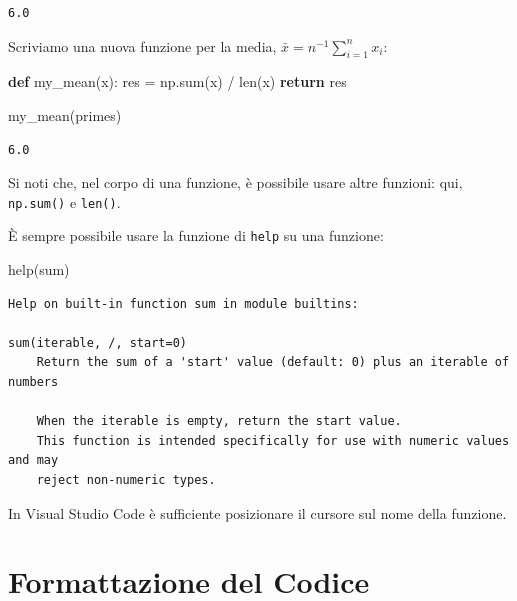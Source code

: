 \documentclass[
  letterpaper,
  krantz2]{{[}./krantz{]}}
\newenvironment{Shaded}{\begin{snugshade}}{\end{snugshade}}
\newcommand{\BuiltInTok}[1]{\textcolor[rgb]{0.00,0.23,0.31}{#1}}
\newcommand{\ControlFlowTok}[1]{\textcolor[rgb]{0.00,0.23,0.31}{\textbf{#1}}}
\newcommand{\KeywordTok}[1]{\textcolor[rgb]{0.00,0.23,0.31}{\textbf{#1}}}
\newcommand{\NormalTok}[1]{\textcolor[rgb]{0.00,0.23,0.31}{#1}}
\newcommand{\OperatorTok}[1]{\textcolor[rgb]{0.37,0.37,0.37}{#1}}
\begin{document}
\begin{verbatim}
6.0
\end{verbatim}

Scriviamo una nuova funzione per la media,
\(\bar{x} = n^{-1}\sum_{i=1}^n x_i\):

\begin{Shaded}
\begin{Highlighting}[]
\KeywordTok{def}\NormalTok{ my\_mean(x):}
\NormalTok{    res }\OperatorTok{=}\NormalTok{ np.}\BuiltInTok{sum}\NormalTok{(x) }\OperatorTok{/} \BuiltInTok{len}\NormalTok{(x)}
    \ControlFlowTok{return}\NormalTok{ res}
\end{Highlighting}
\end{Shaded}

\begin{Shaded}
\begin{Highlighting}[]
\NormalTok{my\_mean(primes)}
\end{Highlighting}
\end{Shaded}

\begin{verbatim}
6.0
\end{verbatim}

Si noti che, nel corpo di una funzione, è possibile usare altre
funzioni: qui, \texttt{np.sum()} e \texttt{len()}.

È sempre possibile usare la funzione di \texttt{help} su una funzione:

\begin{Shaded}
\begin{Highlighting}[]
\BuiltInTok{help}\NormalTok{(}\BuiltInTok{sum}\NormalTok{)}
\end{Highlighting}
\end{Shaded}

\begin{verbatim}
Help on built-in function sum in module builtins:

sum(iterable, /, start=0)
    Return the sum of a 'start' value (default: 0) plus an iterable of numbers
    
    When the iterable is empty, return the start value.
    This function is intended specifically for use with numeric values and may
    reject non-numeric types.
\end{verbatim}

In Visual Studio Code è sufficiente posizionare il cursore sul nome
della funzione.

\section{Formattazione del Codice}\label{formattazione-del-codice}
\end{document}
